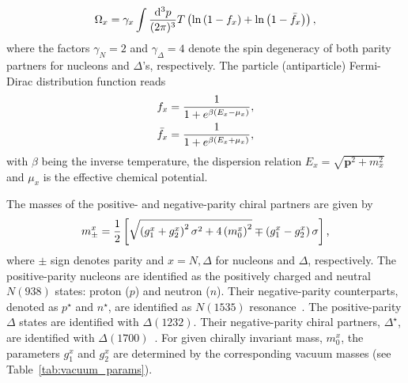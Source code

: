 \documentclass[preprint,showkeys,lengthcheck,nofootinbib,twocolumn,notitlepage,floatfix,superscriptaddress]{revtex4-1}
\newcommand{\dd}{\mathrm{d}}
\begin{document}
\begin{equation}\label{eq:thermokin}
\Omega_x = \gamma_x \int \frac{\dd^3p }{(2\pi)^3} T \left(\ln\left(1-f_x\right) + \ln \left(1 - \bar f_x\right)\right)\rm,
\end{equation}
where the factors $\gamma_N = 2$ and $\gamma_\Delta=4$ denote the spin degeneracy of both parity partners for nucleons and $\Delta$'s, respectively. The particle (antiparticle) Fermi-Dirac distribution function reads
\begin{subequations}
\begin{align}
	f_x &= \frac{1}{1+e^{\beta(E_x-\mu_x)}}\rm ,\\
	\bar f_x &= \frac{1}{1+e^{\beta(E_x+\mu_x)}}\rm,
\end{align}
\end{subequations}
with $\beta$ being the inverse temperature, the dispersion relation $E_x = \sqrt{\boldsymbol p^2+m_x^2}$ and $\mu_x$ is the effective chemical potential.

The masses of the positive- and negative-parity chiral partners are given by
\begin{equation}\label{eq:doublet_mass}
	m^x_\pm = \frac{1}{2}\left[\sqrt{\left(g_1^x+g_2^x\right)^2\sigma^2 + 4\left(m_0^x\right)^2} \mp \left(g^x_1-g^x_2\right)\sigma\right] \textrm,
\end{equation}
where $\pm$ sign denotes parity and $x=N,\Delta$ for nucleons and $\Delta$, respectively. The positive-parity nucleons are identified as the positively charged and neutral $N(938)$ states: proton ($p$) and neutron ($n$). Their negative-parity counterparts, denoted as $p^\star$ and $n^\star$, are identified as $N(1535)$ resonance~\cite{ParticleDataGroup:2020ssz}. The positive-parity $\Delta$ states are identified with $\Delta(1232)$. Their negative-parity chiral partners, $\Delta^\star$, are identified with $\Delta(1700)$~\cite{ParticleDataGroup:2020ssz}. For given chirally invariant mass, $m_0^x$, the parameters $g_1^x$ and $g_2^x$ are determined by the corresponding vacuum masses (see Table~\ref{tab:vacuum_params}).
\end{document}
